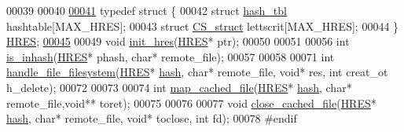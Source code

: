 \begin{DoxyCode}
00039 
00040 
\hypertarget{hres_8h_source_l00041}{}\hyperlink{structHRES}{00041} \textcolor{keyword}{typedef} \textcolor{keyword}{struct }\{
00042         \textcolor{keyword}{struct }\hyperlink{structhash__tbl}{hash_tbl}         hashtable[MAX\_HRES];
00043         \textcolor{keyword}{struct }\hyperlink{structCS__struct}{CS_struct}        lettscrit[MAX\_HRES];
00044 \} \hyperlink{structHRES}{HRES};
\hypertarget{hres_8h_source_l00045}{}\hyperlink{structHRES_a75644267093228e40a1569db3d8dcb99}{00045} 
00049 \textcolor{keywordtype}{void} \hyperlink{hres_8c_aa0ae30f694c899f863c4e1404354b3fa}{init_hres}(\hyperlink{structHRES}{HRES}* ptr);
00050 
00051 
00056 \textcolor{keywordtype}{int} \hyperlink{hres_8c_a118782cf3075e54ee1fc6f6237eab316}{is_inhash}(\hyperlink{structHRES}{HRES}* phash, \textcolor{keywordtype}{char}* remote\_file);
00057 
00058 
00071 \textcolor{keywordtype}{int} \hyperlink{hres_8c_a29c7cd31b93151d8cf8350c10889dc71}{handle_file_filesystem}(\hyperlink{structHRES}{HRES}* \hyperlink{hash_8c_ab452b41a0ffaccf36bb382238124f330}{hash}, \textcolor{keywordtype}{char}* remote\_file, \textcolor{keywordtype}{void}* res, \textcolor{keywordtype}{int} creat\_ot
      h\_delete);
00072 
00073 
00074 \textcolor{keywordtype}{int} \hyperlink{hres_8c_a9ecd1c6c001cbcfda6f82d7093ed51b1}{map_cached_file}(\hyperlink{structHRES}{HRES}* \hyperlink{hash_8c_ab452b41a0ffaccf36bb382238124f330}{hash}, \textcolor{keywordtype}{char}* remote\_file,\textcolor{keywordtype}{void}** toret);
00075 
00076 
00077 \textcolor{keywordtype}{void} \hyperlink{hres_8c_a41d556d59572d6c5f91d62ee04343f7b}{close_cached_file}(\hyperlink{structHRES}{HRES}* \hyperlink{hash_8c_ab452b41a0ffaccf36bb382238124f330}{hash}, \textcolor{keywordtype}{char}* remote\_file, \textcolor{keywordtype}{void}* toclose, \textcolor{keywordtype}{int} fd);
00078 \textcolor{preprocessor}{#endif}
\end{DoxyCode}
